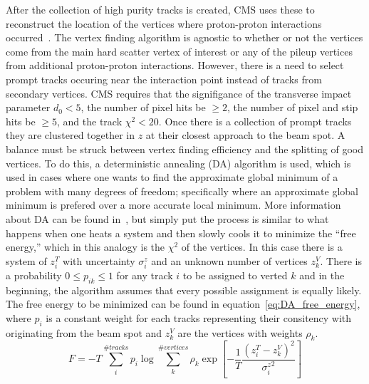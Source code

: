 After the collection of high purity tracks is created, CMS uses these to reconstruct the location of the vertices where proton-proton interactions occurred~\cite{TRK-11-001}.
The vertex finding algorithm is agnostic to whether or not the vertices come from the main hard scatter vertex of interest or any of the pileup vertices from additional proton-proton interactions.
However, there is a need to select prompt tracks occuring near the interaction point instead of tracks from secondary vertices.
CMS requires that the signifigance of the transverse impact parameter $d_{0}<5$, the number of pixel hits be $\geq2$, the number of pixel and stip hits be $\geq5$, and the track $\chi^{2}<20$.
Once there is a collection of prompt tracks they are clustered together in $z$ at their closest approach to the beam spot.
A balance must be struck between vertex finding efficiency and the splitting of good vertices.
To do this, a deterministic annealing (DA) algorithm is used, which is used in cases where one wants to find the approximate global minimum of a problem with many degrees of freedom; specifically where an approximate global minimum is prefered over a more accurate local minimum.
More information about DA can be found in~\cite{Rose1998}, but simply put the process is similar to what happens when one heats a system and then slowly cools it to minimize the ``free energy,'' which in this analogy is the $\chi^{2}$ of the vertices.
In this case there is a system of $z^{T}_{i}$ with uncertainty $\sigma^{z}_{i}$ and an unknown number of vertices $z^{V}_{k}$.
There is a probability $0\leq{p_{ik}}\leq1$ for any track $i$ to be assigned to verted $k$ and in the beginning, the algorithm assumes that every possible assignment is equally likely.
The free energy to be minimized can be found in equation~\ref{eq:DA_free_energy}, where $p_{i}$ is a constant weight for each tracks representing their consitency with originating from the beam spot and $z_{k}^{V}$ are the vertices with weights $\rho_{k}$.
\begin{equation}
	\label{eq:DA_free_energy}
	F=-T\sum_{i}^{\#tracks}p_{i}\log\sum_{k}^{\#vertices}\rho_{k}\exp\left[-\frac{1}{T}\frac{\left(z_{i}^{T}-z_{k}^{V}\right)^{2}}{{\sigma_{i}^{z}}^{2}}\right]
\end{equation}


